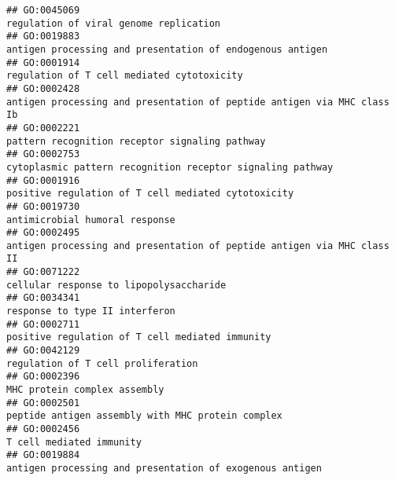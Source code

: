 \documentclass[
]{article}
\begin{document}
\begin{verbatim}
## GO:0045069                                                                                                           regulation of viral genome replication
## GO:0019883                                                                                        antigen processing and presentation of endogenous antigen
## GO:0001914                                                                                                       regulation of T cell mediated cytotoxicity
## GO:0002428                                                                          antigen processing and presentation of peptide antigen via MHC class Ib
## GO:0002221                                                                                                   pattern recognition receptor signaling pathway
## GO:0002753                                                                                       cytoplasmic pattern recognition receptor signaling pathway
## GO:0001916                                                                                              positive regulation of T cell mediated cytotoxicity
## GO:0019730                                                                                                                   antimicrobial humoral response
## GO:0002495                                                                          antigen processing and presentation of peptide antigen via MHC class II
## GO:0071222                                                                                                          cellular response to lipopolysaccharide
## GO:0034341                                                                                                                   response to type II interferon
## GO:0002711                                                                                                  positive regulation of T cell mediated immunity
## GO:0042129                                                                                                               regulation of T cell proliferation
## GO:0002396                                                                                                                     MHC protein complex assembly
## GO:0002501                                                                                                peptide antigen assembly with MHC protein complex
## GO:0002456                                                                                                                         T cell mediated immunity
## GO:0019884                                                                                         antigen processing and presentation of exogenous antigen

\end{verbatim}
\end{document}

